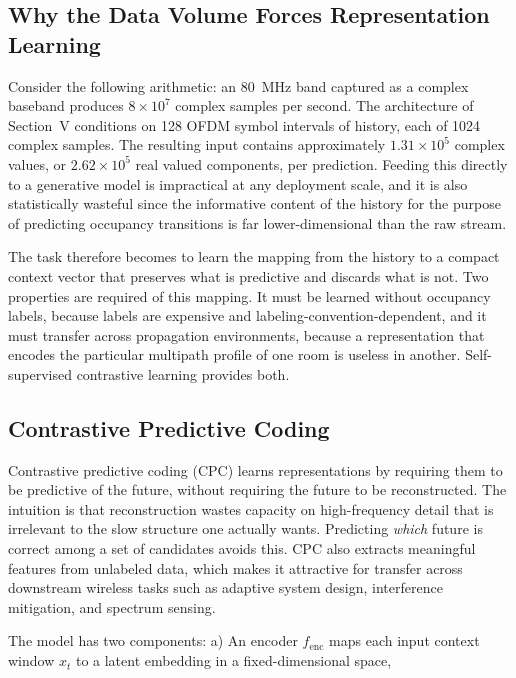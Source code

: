 \documentclass[lettersize,journal]{IEEEtran}
\begin{document}
\subsection{\textbf{Why the Data Volume Forces Representation Learning}}
Consider the following arithmetic: an 80~MHz band captured 
as a complex baseband produces $8\times10^{7}$ complex samples per second. The
architecture of Section~V conditions on 128 OFDM symbol intervals of history, each of
1024 complex samples. The resulting input contains approximately 
$1.31\times10^{5}$ complex values, or
$2.62\times10^{5}$ real valued components, per prediction. Feeding this directly to
a generative model is impractical at any deployment scale, and it is
also statistically wasteful since the informative content of the history for
the purpose of predicting occupancy transitions is far
lower-dimensional than the raw stream.

The task therefore becomes to learn the mapping from the history to a compact
context vector that preserves what is predictive and discards what is
not. Two properties are required of this mapping. It must be learned
without occupancy labels, because labels are expensive and
labeling-convention-dependent, and it must transfer across propagation
environments, because a representation that encodes the particular
multipath profile of one room is useless in another. Self-supervised
contrastive learning provides both.

\subsection{\textbf{Contrastive Predictive Coding}}
Contrastive predictive coding (CPC) \cite{Oord2018} learns
representations by requiring them to be predictive of the future, without
requiring the future to be reconstructed. The intuition is that
reconstruction wastes capacity on high-frequency detail that is
irrelevant to the slow structure one actually wants. Predicting
\emph{which} future is correct among a set of candidates avoids this.
CPC also extracts meaningful features from unlabeled data, which makes it
attractive for transfer across downstream wireless tasks such as adaptive
system design, interference mitigation, and spectrum sensing.

The model has two components: a) An encoder $f_{\mathrm{enc}}$ maps each
input context window $x_t$ to a latent embedding in a fixed-dimensional
space,
\end{document}

